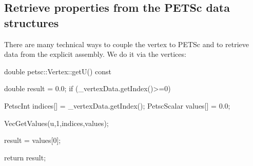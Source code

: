\subsection{Retrieve properties from the PETSc data structures}

There are many technical ways to couple the vertex to PETSc and to retrieve
data from the explicit assembly.
We do it via the vertices:

\begin{code}
double petsc::Vertex::getU() const {
  double result = 0.0;
  if (_vertexData.getIndex()>=0) {
    PetscInt     indices[] = {_vertexData.getIndex()};
    PetscScalar  values[]  = {0.0};

    VecGetValues(u,1,indices,values);

    result = values[0];
  }
  return result;
}
\end{code}




